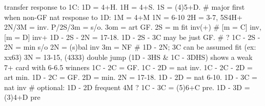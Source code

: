 transfer response to 1C: 1D = 4+H. 1H = 4+S. 1S = (4)5+D. 
    # major first when non-GF
nat response to 1D: 1M = 4+M
1N = 6-10
2H = 3-7, 5S4H+ 
    2N/3M = inv. P/2S/3m = s/o. 3om = art GF.
2S = m fit inv(+)  # [m = C] inv, [m = D] inv+
    1D - 2S - 2N = 17-18. 1D - 2S - 3C may be just GF.  # ?
    1C - 2S - 2N = min s/o
2N = (s)bal inv
    3m = NF  # 1D - 2N; 3C can be assumed fit (ex: xx63)
3N = 13-15, (4333)
double jump (1D - 3HS & 1C - 3DHS) shows a weak 7+ card with 6-6.5 winners
1C - 2C = GF. 1C - 2D = nat inv.
    1C - 2C - 2D = art min.
1D - 2C = GF. 
    2D = min. 2N = 17-18.
1D - 2D = nat 6-10. 1D - 3C = nat inv
    # optional: 1D - 2D frequent 4M ?
1C - 3C = (5)6+C pre. 1D - 3D = (3)4+D pre